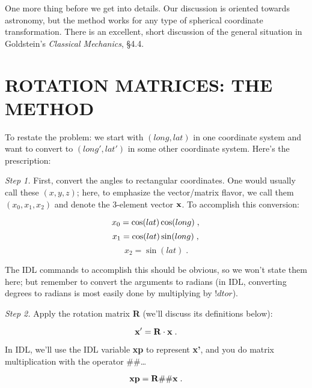 \documentclass[11pt,preprint]{aastex}
\begin{document}
	One more thing before we get into details. Our discussion is
oriented towards astronomy, but the method works for any type of
spherical coordinate transformation. There is an excellent, short
discussion of the general situation in Goldstein's {\it Classical
Mechanics}, \S 4.4.

\section {ROTATION MATRICES: THE METHOD}

	To restate the problem: we start with $(long, lat)$ in one
coordinate system and want to convert to $(long', lat')$ in some other
coordinate system. Here's the prescription:

	{\it Step 1.} First, convert the angles to rectangular
coordinates.  One would usually call these $(x, y, z)$; here, to
emphasize the vector/matrix flavor, we call them $(x_0, x_1, x_2)$ and
denote the 3-element vector ${\bf x}$.  To accomplish this conversion:

\begin{mathletters}
\begin{equation}
x_0 = \cos(lat) \cos(long) \; , \\
\end{equation}
\begin{equation}
x_1 = \cos(lat) \sin(long) \; , \\
\end{equation}
\begin{equation}
x_2 = \sin(lat) \; .
\end{equation}
\end{mathletters}

\noindent The IDL commands to accomplish this should be obvious, so we
won't state them here; but remember to convert the arguments to radians
(in IDL, converting degrees to radians is most easily done by
multiplying by $!dtor$). 

	{\it Step 2.} Apply the rotation matrix {\bf R} (we'll discuss its
definitions below): 

\begin{equation}
{\bf x'} = {\bf R \cdot x} \; .
\end{equation}

\noindent In IDL, we'll use the IDL variable {\bf xp} to represent {\bf
x'}, and you do matrix multiplication with the operator $\#\#$\dots

\begin{equation}
{\bf xp} = {\bf R} \#\# {\bf x} \; .
\end{equation}
\end{document}
